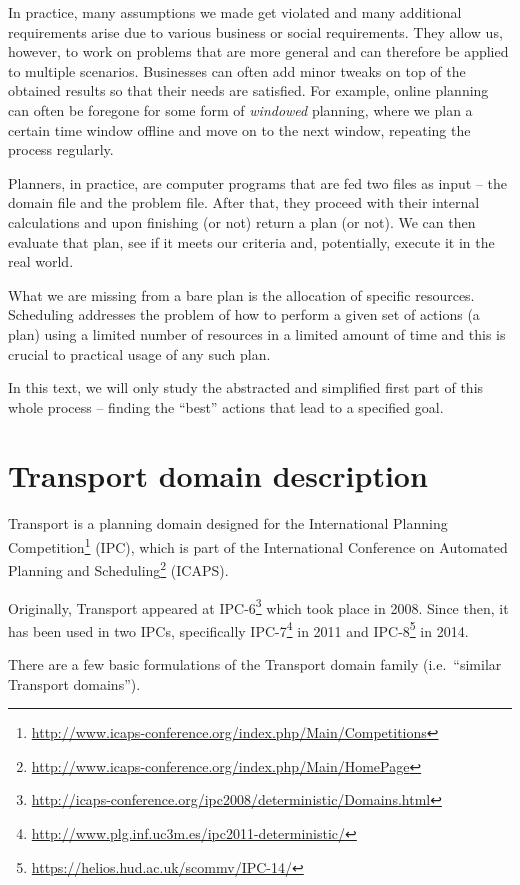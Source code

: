 In practice, many assumptions we made get violated and many additional requirements arise
due to various business or social requirements. They allow us, however, to work
on problems that are more general and can therefore be applied to multiple scenarios.
Businesses can often add minor tweaks on top of the obtained results so that
their needs are satisfied. 
For example, online planning can often be foregone for some form of \textit{windowed} planning,
where we plan a certain time window offline and move on to the next window,
repeating the process regularly.

Planners, in practice, are computer programs that are fed two files as input
-- the domain file and the problem file. After that, they proceed with their internal calculations
and upon finishing (or not) return a plan (or not). 
We can then evaluate that plan, see if it meets our criteria and, potentially,
execute it in the real world.

What we are missing from a bare plan is the allocation of specific resources.
Scheduling addresses the problem of how to perform a given set of actions (a plan)
using a limited number of resources in a limited amount of time and
this is crucial to practical usage of any such plan. \cite[Chapter~15]{Ghallab2004}

In this text, we will only study the abstracted and simplified first part of this whole process
-- finding the ``best'' actions that lead to a specified goal.




\section{Transport domain description}

Transport is a planning domain designed for
the International Planning
Competition\footnote{\url{http://www.icaps-conference.org/index.php/Main/Competitions}}
(IPC), which is part of the International Conference on Automated Planning and
Scheduling\footnote{\url{http://www.icaps-conference.org/index.php/Main/HomePage}} (ICAPS).

Originally, Transport appeared at 
IPC-6\footnote{\url{http://icaps-conference.org/ipc2008/deterministic/Domains.html}} which took place in 2008.
Since then, it has been used in two IPCs,
specifically IPC-7\footnote{\url{http://www.plg.inf.uc3m.es/ipc2011-deterministic/}} in 2011
and IPC-8\footnote{\url{https://helios.hud.ac.uk/scommv/IPC-14/}} in 2014.

There are a few basic formulations of the Transport domain family (i.e.~``similar Transport domains'').

